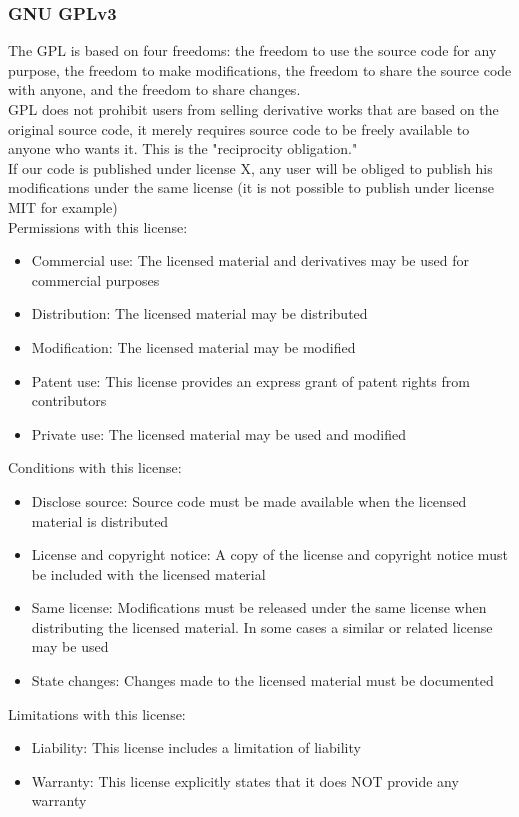 \documentclass[a4paper]{article}
\begin{document}
			\subsubsection{GNU GPLv3}
				The GPL is based on four freedoms: the freedom to use the source code for any purpose, the freedom to make modifications, the freedom to share the source code with anyone, and the freedom to share changes.\\
				GPL does not prohibit users from selling derivative works that are based on the original source code, it merely requires source code to be freely available to anyone who wants it. This is the "reciprocity obligation."\\
				If our code is published under license X, any user will be obliged to publish his modifications under the same license (it is not possible to publish under license MIT for example)\\
				Permissions with this license:
				\begin{itemize}
					\item Commercial use: The licensed material and derivatives may be used for commercial purposes
					\item Distribution: The licensed material may be distributed
					\item Modification: The licensed material may be modified
					\item Patent use: This license provides an express grant of patent rights from contributors
					\item Private use: The licensed material may be used and modified
				\end{itemize}
				Conditions with this license:
				\begin{itemize}
					\item Disclose source: Source code must be made available when the licensed material is distributed
					\item License and copyright notice: A copy of the license and copyright notice must be included with the licensed material
					\item Same license: Modifications must be released under the same license when distributing the licensed material. In some cases a similar or related license may be used
					\item State changes: Changes made to the licensed material must be documented
				\end{itemize}
				Limitations with this license:
				\begin{itemize}
					\item Liability: This license includes a limitation of liability
					\item Warranty: This license explicitly states that it does NOT provide any warranty
				\end{itemize}
\end{document}
